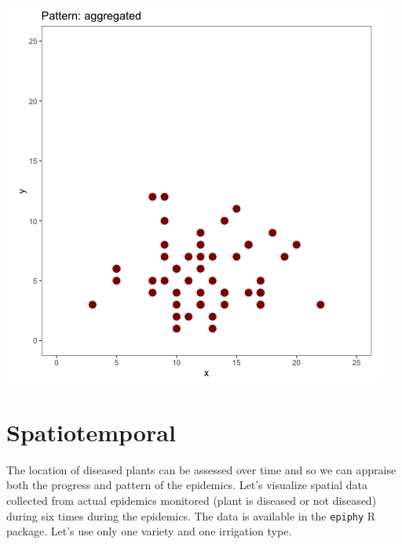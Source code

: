 \documentclass[
  letterpaper,
  DIV=11,
  numbers=noendperiod]{scrreprt}
\begin{document}
\includegraphics{./imgs/patterns.gif}

\hypertarget{spatiotemporal}{%
\section{Spatiotemporal}\label{spatiotemporal}}

The location of diseased plants can be assessed over time and so we can
appraise both the progress and pattern of the epidemics. Let's visualize
spatial data collected from actual epidemics monitored (plant is
diseased or not diseased) during six times during the epidemics. The
data is available in the \texttt{epiphy} R package. Let's use only one
variety and one irrigation type.
\end{document}
